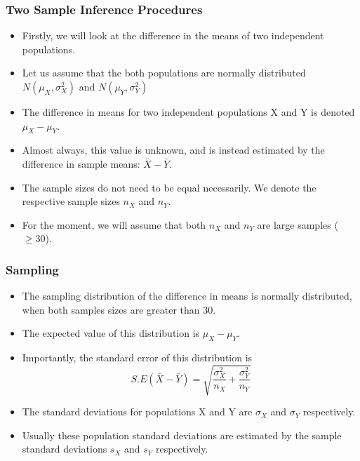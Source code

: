 \documentclass[a4]{beamer}
\begin{document}
\begin{frame}
\frametitle{Two Sample Inference Procedures}

\begin{itemize}
\item Firstly, we will look at the difference in the means of two independent populations.
\item Let us assume that the both populations are normally distributed $N(\mu_X,\sigma^2_X)$ and $N(\mu_Y,\sigma^2_Y)$
\item The difference in means for two independent populations X and Y is denoted $\mu_X - \mu_Y$.
\item Almost always, this value is unknown, and is instead estimated by the difference in sample means: $\bar{X} - \bar{Y}.$
\item The sample sizes do not need to be equal necessarily. We denote the respective sample sizes $n_X$ and $n_Y$.
\item For the moment, we will assume that both $n_X$ and $n_Y$ are large samples ($ \geq 30$).
\end{itemize}
\end{frame}
\begin{frame}
\frametitle{Sampling}
\begin{itemize}
\item The sampling distribution of the difference in means is normally distributed, when both samples sizes are greater than 30.
\item The expected value of this distribution is $\mu_X - \mu_Y$.
\item Importantly, the standard error of this distribution is
\[ S.E(\bar{X} - \bar{Y}) = \sqrt{\frac{\sigma^2_X}{n_X} + \frac{\sigma^2_Y}{n_Y}} \]
\item The standard deviations for populations X and Y are $\sigma_X$ and $\sigma_Y$ respectively.
\item Usually these population standard deviations are estimated by the sample standard deviations $s_X$ and $s_Y$ respectively.
\end{itemize}
\end{frame}
\end{document}
